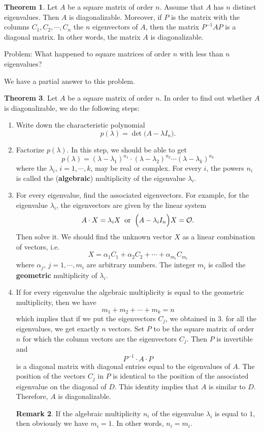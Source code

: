 \documentclass[11pt]{article}
\theoremstyle{definition}
\newtheorem{thm}{Theorem}[section]
\newtheorem{rem}[thm]{Remark}
\theoremstyle{plain}
\begin{document}
\begin{thm}
Let $A$ be a square matrix of order $n$. Assume that $A$ has $n$ distinct eigenvalues. Then $A$ is diagonalizable. Moreover, if $P$ is the matrix with the columns $C_1, C_2,\cdots,C_n$ the $n$ eigenvectors of $A$, then the matrix $P^{-1}AP$ is a diagonal matrix. In other words, the matrix $A$ is diagonalizable.
\end{thm}

Problem: What happened to square matrices of order $n$ with less than $n$ eigenvalues?


We have a partial answer to this problem.

\begin{thm}
Let $A$ be a square matrix of order $n$. In order to find out whether $A$ is diagonalizable, we do the following steps:

\begin{enumerate}
  \item Write down the characteristic polynomial
\[
p(\lambda) = \det\Big(A - \lambda I_n\Big).
\]

  \item Factorize $p(\lambda) $. In this step, we should be able to get
\[
p(\lambda) = (\lambda - \lambda_1)^{n_1} \cdot (\lambda - \lambda_2)^{n_2}\cdots (\lambda - \lambda_k)^{n_k}
\]
where the $\lambda_i$, $i=1,\cdots,k$, may be real or complex. For every $i$, the powers $n_i$ is called the (\textbf{algebraic}) multiplicity of the eigenvalue $\lambda_i$.

  \item For every eigenvalue, find the associated eigenvectors. For example, for the eigenvalue $\lambda_i$, the eigenvectors are given by the linear system
\[
A \cdot X = \lambda_i X \;\;\mbox{or}\;\; \Big(A - \lambda_i I_n \Big) X = {\cal O}.
\]
Then solve it. We should find the unknown vector $X$ as a linear combination of vectors, i.e.
\[
X = \alpha_1 C_1 + \alpha_2 C_2 + \cdots + \alpha_{m_i} C_{m_i}
\]
where $\alpha_j$, $j=1,\cdots, m_i$ are arbitrary numbers. The integer $m_i$ is called the \textbf{geometric} multiplicity of $\lambda_i$.

  \item If for every eigenvalue the algebraic multiplicity is equal to the geometric multiplicity, then we have
\[
m_1 + m_2 + \cdots + m_k = n
\]
which implies that if we put the eigenvectors $C_j$, we obtained in $3$. for all the eigenvalues, we get exactly $n$ vectors. Set $P$ to be the square matrix of order $n$ for which the column vectors are the eigenvectors $C_j$. Then $P$ is invertible and
\[
P^{-1}\cdot A \cdot P
\]
is a diagonal matrix with diagonal entries equal to the eigenvalues of $A$. The position of the vectors $C_j$ in $P$ is identical to the position of the associated eigenvalue on the diagonal of $D$. This identity implies that $A$ is similar to $D$. Therefore, $A$ is diagonalizable.
\begin{rem}
If the algebraic multiplicity $n_i$ of the eigenvalue $\lambda_i$ is equal to $1$, then obviously we have $m_i = 1$. In other words, $n_i = m_i$.
\end{rem}


\end{enumerate}
\end{thm}
\end{document}
